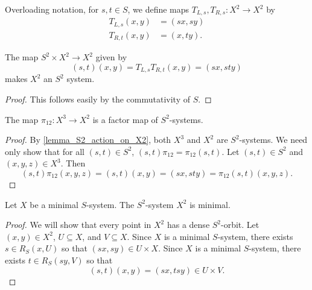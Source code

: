 Overloading notation, for $s, t \in S$, we define maps $T_{L,s}, T_{R,s}: X^2 \to X^2$ by
\begin{align*}
    T_{L,s}(x,y) &= (sx, sy)\\
    T_{R,t}(x,y) &= (x, ty).
\end{align*}

\begin{lemma}[Action of $S^2$ on $X^2$]
\label{lemma_S2_action_on_X2}
\leanok{}
    The map $S^2 \times X^2 \to X^2$ given by
    \[(s,t)(x,y) = T_{L,s}T_{R,t}(x,y) = (sx,sty)\]
    makes $X^2$ an $S^2$ system.
\end{lemma}

\begin{proof}
\leanok{}
    This follows easily by the commutativity of $S$.
\end{proof}

\begin{lemma}
    \label{lemma_x3_to_x2_is_S2_factor_map}
    \leanok{}
    The map $\pi_{12}: X^3 \to X^2$ is a factor map of $S^2$-systems.
\end{lemma}

\begin{proof}
\leanok{}
    By \cref{lemma_S2_action_on_X2}, both $X^3$ and $X^2$ are $S^2$-systems.  We need only show that for all $(s,t) \in S^2$, $(s,t) \pi_{12} = \pi_{12} (s,t)$.  Let $(s,t) \in S^2$ and $(x,y,z) \in X^3$.  Then
    \[(s,t) \pi_{12} (x,y,z) = (s,t)(x,y) = (sx,sty) = \pi_{12} (s,t) (x,y,z).\]
\end{proof}

\begin{lemma}
    \label{lem_minimal_h_from_g}
    \leanok{}
    Let $X$ be a minimal $S$-system. The $S^2$-system $X^2$ is minimal.
\end{lemma}

\begin{proof}
\leanok{}
    We will show that every point in $X^2$ has a dense $S^2$-orbit.  Let $(x,y) \in X^2$, $U \subseteq X$, and $V \subseteq X$.  Since $X$ is a minimal $S$-system, there exists $s \in R_S(x,U)$ so that $(sx,sy) \in U \times X$.  Since $X$ is a minimal $S$-system, there exists $t \in R_S(sy,V)$ so that
    \[(s,t) (x,y) = (sx,tsy) \in U \times V.\]
\end{proof}


